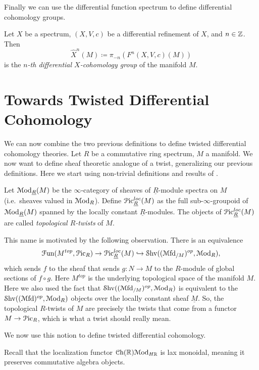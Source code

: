 \documentclass[10pt]{amsart}
\begin{document}
Finally we can use the differential function spectrum to define differential cohomology groups.

\begin{definition}
  Let $X$ be a spectrum, $(X,V,c)$ be a differential refinement of $X$, and $n \in \mathbb{Z}$. Then 
  \[ \hat{X}^n(M) \coloneq \pi_{-n}(F^n(X,V,c)(M))\]
  is the \emph{$n$-th differential $X$-cohomology group} of the manifold $M$.
\end{definition}

\section{Towards Twisted Differential Cohomology}
We can now combine the two previous definitions to define twisted differential cohomology theories. Let $R$ be a commutative ring spectrum, $M$ a manifold. We now want to define sheaf theoretic analogue of a twist, generalizing our previous definitions. Here we start using non-trivial definitions and results of \cite{bunkegepner2021diffktheory}.

\begin{definition}
  Let $\mathcal{M}\mathrm{od}_{\underline{R}}(M)$ be the $\infty$-category of sheaves of $\underline{R}$-module spectra on $M$ (i.e.~sheaves valued in $\mathcal{M}\mathrm{od}_R$). Define $\mathcal{P}\mathrm{ic}^{loc}_{\underline{R}}(M)$ as the full sub-$\infty$-groupoid of $\mathcal{M}\mathrm{od}_{\underline{R}}(M)$ spanned by the locally constant $\underline{R}$-modules. The objects of $\mathcal{P}\mathrm{ic}^{loc}_{\underline{R}}(M)$ are called \emph{topological $R$-twists} of $M$.
\end{definition}

This name is motivated by the following observation. There is an equivalence 
\[ \mathcal{F}\mathrm{un}(M^{top},\mathcal{P}\mathrm{ic}_R) \to \mathcal{P}\mathrm{ic}^{loc}_{\underline{R}}(M) \hookrightarrow \mathcal{S}\mathrm{hv}((\mathcal{M}\mathrm{fd}_{/M})^{op},\mathcal{M}\mathrm{od}_R),\]
which sends $f$ to the sheaf that sends $g\colon N \to M$ to the $R$-module of global sections of $f\circ g$. Here $M^{top}$ is the underlying topological space of the manifold $M$. Here we also used the fact that $\mathcal{S}\mathrm{hv}((\mathcal{M}\mathrm{fd}_{/M})^{op},\mathcal{M}\mathrm{od}_R)$ is equivalent to the $\mathcal{S}\mathrm{hv}((\mathcal{M}\mathrm{fd})^{op},\mathcal{M}\mathrm{od}_R)$ objects over the locally constant sheaf $\underline{M}$. So, the topological $R$-twists of $M$ are precisely the twists that come from a functor $M \to \mathcal{P}\mathrm{ic}_R$, which is what a twist should really mean.


We now use this notion to define twisted differential cohomology. 

\begin{remark}
  Recall that the localization functor $\mathcal{C}\mathrm{h}(\mathbb{R}) \mathcal{M}\mathrm{od}_{H\mathbb{R}}$ is lax monoidal, meaning it preserves commutative algebra objects. 
\end{remark}
\end{document}
